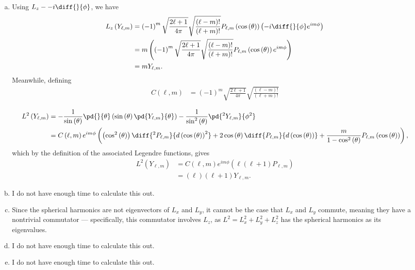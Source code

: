 \documentclass[10pt]{mypackage}
\begin{document}
\begin{solution}[35.21]\hfill
  \begin{enumerate}[(a)]
    \item Using $L_{z} - -i\diff{}{\phi}$, we have
      \begin{align*}
        L_z\left( Y_{\ell,m} \right) &= \left( -1 \right)^{m}\sqrt{\frac{2\ell + 1}{4\pi}}\sqrt{\frac{\left( \ell - m \right)!}{\left( \ell + m \right)!}}P_{\ell,m}\left( \cos\left( \theta \right) \right) \left( -i\diff{}{\phi}e^{im\phi} \right)\\
                                     &= m\left( \left( -1 \right)^{m}\sqrt{\frac{2\ell + 1}{4\pi}}\sqrt{\frac{\left( \ell - m \right)!}{\left( \ell + m \right)!}} P_{\ell,m}\left( \cos\left( \theta \right) \right)e^{im\phi} \right)\\
                                     &= mY_{\ell,m}.
      \end{align*}
      Meanwhile, defining
      \begin{align*}
        C\left( \ell,m \right) &= \left( -1 \right)^{m}\sqrt{\frac{2\ell + 1}{4\pi}}\sqrt{\frac{\left( \ell - m \right)!}{\left( \ell + m \right)!}}
      \end{align*}
      
      \begin{align*}
        L^2\left( Y_{\ell,m} \right) &= -\frac{1}{\sin\left( \theta \right)} \pd{}{\theta}\left( \sin\left( \theta \right)\pd{Y_{\ell,m}}{\theta} \right) - \frac{1}{\sin^2\left( \theta \right)}\pd{^2Y_{\ell,m}}{\phi^2}\\
                                     &= C\left( \ell,m \right)e^{im\phi}\left( \left( \cos^2\left( \theta \right) \right)\diff{^2P_{\ell,m}}{d\left( \cos\left( \theta \right) \right)^2} + 2\cos\left( \theta \right)\diff{P_{\ell,m}}{d\left( \cos\left( \theta \right) \right)} + \frac{m}{1-\cos^2\left( \theta \right)} P_{\ell,m}\left( \cos\left( \theta \right) \right) \right),
      \end{align*}
      which by the definition of the associated Legendre functions, gives
      \begin{align*}
        L^2\left( Y_{\ell,m} \right) &= C\left( \ell,m \right)e^{im\phi}\left( \ell\left( \ell + 1 \right)P_{\ell,m} \right)\\
                                     &= \left( \ell \right)\left( \ell + 1 \right)Y_{\ell,m}.
      \end{align*}
    \item I do not have enough time to calculate this out.
    \item Since the spherical harmonics are not eigenvectors of $L_x$ and $L_y$, it cannot be the case that $L_x$ and $L_y$ commute, meaning they have a nontrivial commutator --- specifically, this commutator involves $L_z$, as $L^2 = L_x^2 + L_y^2 + L_z^2$ has the spherical harmonics as its eigenvalues.
    \item I do not have enough time to calculate this out.
    \item I do not have enough time to calculate this out.
  \end{enumerate}
\end{solution}
\end{document}
